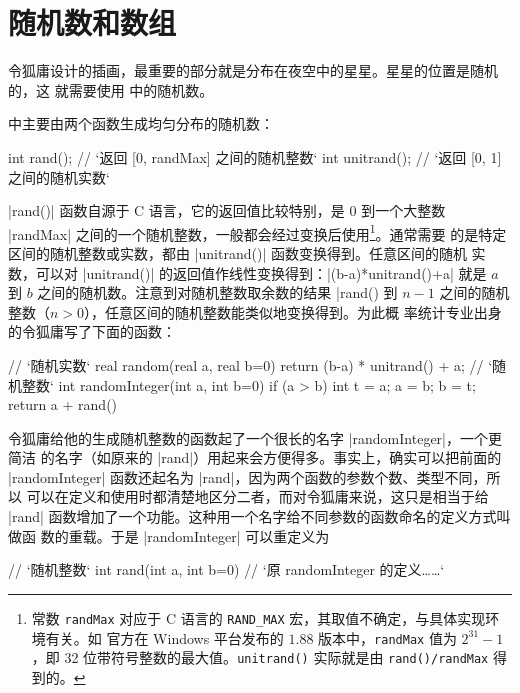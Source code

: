 \section{随机数和数组}
\label{sec:randomarray}

令狐庸设计的插画，最重要的部分就是分布在夜空中的星星。星星的位置是随机的，这
就需要使用 \Asy{} 中的随机数。

\Asy{} 中主要由两个函数生成均匀分布的随机数：
\begin{asycode}
int rand();         // `\color{comment}返回 [0, randMax] 之间的随机整数`
int unitrand();     // `\color{comment}返回 [0, 1] 之间的随机实数`
\end{asycode}
|rand()| 函数自源于 C 语言，它的返回值比较特别，是 $0$ 到一个大整数 |randMax|
之间的一个随机整数，一般都会经过变换后使用\footnote{常数 \lstinline=randMax= 
对应于 C 语言的 \lstinline=RAND_MAX= 宏，其取值不确定，与具体实现环境有关。如
官方在 Windows 平台发布的 $1.88$ 版本中，\lstinline=randMax= 值为
$2^{31}-1$，即 32 位带符号整数的最大值。\lstinline=unitrand()= 实际就是由
\lstinline=rand()/randMax= 得到的。}。通常需要
的是特定区间的随机整数或实数，都由 |unitrand()| 函数变换得到。任意区间的随机
实数，可以对 |unitrand()| 的返回值作线性变换得到：|(b-a)*unitrand()+a| 就是
$a$ 到 $b$ 之间的随机数。注意到对随机整数取余数的结果 |rand() %
到 $n-1$ 之间的随机整数（$n>0$），任意区间的随机整数能类似地变换得到。为此概
率统计专业出身的令狐庸写了下面的函数：
\begin{asycode}
// `\color{comment}随机实数`
real random(real a, real b=0)
{
    return (b-a) * unitrand() + a;
}
// `\color{comment}随机整数`
int randomInteger(int a, int b=0)
{
    if (a > b) {
        int t = a;
        a = b;
        b = t;
    }
    return a + rand() %
}
\end{asycode}

令狐庸给他的生成随机整数的函数起了一个很长的名字 |randomInteger|，一个更简洁
的名字（如原来的 |rand|）用起来会方便得多。事实上，确实可以把前面的
|randomInteger| 函数还起名为 |rand|，因为两个函数的参数个数、类型不同，所以
\Asy{} 可以在定义和使用时都清楚地区分二者，而对令狐庸来说，这只是相当于给
|rand| 函数增加了一个功能。这种用一个名字给不同参数的函数命名的定义方式叫做函
数的重载。于是 |randomInteger| 可以重定义为
\begin{asycode}
// `\color{comment}随机整数`
int rand(int a, int b=0)
{
    // `\color{comment}原 randomInteger 的定义……`
}
\end{asycode}

